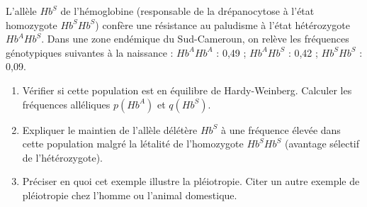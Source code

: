 \documentclass[11pt]{article}
\begin{document}
\begin{exercice}
L'allèle $Hb^S$ de l'hémoglobine (responsable de la drépanocytose à l'état homozygote $Hb^S Hb^S$) confère une résistance au paludisme à l'état hétérozygote $Hb^A Hb^S$. Dans une zone endémique du Sud-Cameroun, on relève les fréquences génotypiques suivantes à la naissance : $Hb^A Hb^A$ : 0,49 ; $Hb^A Hb^S$ : 0,42 ; $Hb^S Hb^S$ : 0,09.
\begin{enumerate}
    \item Vérifier si cette population est en équilibre de Hardy-Weinberg. Calculer les fréquences alléliques $p(Hb^A)$ et $q(Hb^S)$.
    \item Expliquer le maintien de l'allèle délétère $Hb^S$ à une fréquence élevée dans cette population malgré la létalité de l'homozygote $Hb^S Hb^S$ (avantage sélectif de l'hétérozygote).
    \item Préciser en quoi cet exemple illustre la pléiotropie. Citer un autre exemple de pléiotropie chez l'homme ou l'animal domestique.
\end{enumerate}
\end{exercice}
\end{document}

